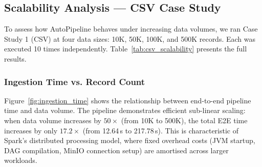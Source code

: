 \documentclass[12pt, a4paper]{article}
\begin{document}
\subsection{Scalability Analysis --- CSV Case Study}

To assess how AutoPipeline behaves under increasing data volumes, we ran Case Study 1 (CSV) at four data sizes: 10K, 50K, 100K, and 500K records. Each was executed 10 times independently. Table~\ref{tab:csv_scalability} presents the full results.

\begin{table}[H]
\centering
\caption{CSV case study scalability across data sizes (mean $\pm$ std, N=10)}
\label{tab:csv_scalability}
\renewcommand{\arraystretch}{1.3}
\end{table}

\subsubsection{Ingestion Time vs. Record Count}

Figure~\ref{fig:ingestion_time} shows the relationship between end-to-end pipeline time and data volume. The pipeline demonstrates efficient sub-linear scaling: when data volume increases by $50\times$ (from 10K to 500K), the total E2E time increases by only $17.2\times$ (from 12.64\,s to 217.78\,s). This is characteristic of Spark's distributed processing model, where fixed overhead costs (JVM startup, DAG compilation, MinIO connection setup) are amortised across larger workloads.
\end{document}

